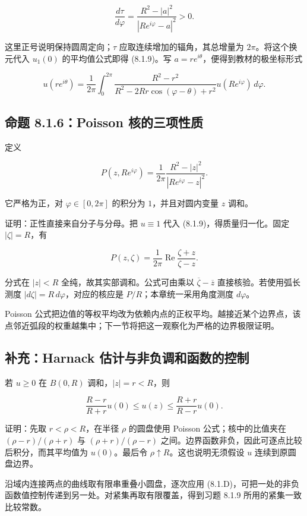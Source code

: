\documentclass[11pt,a4paper]{article}
\begin{document}
\[
\frac{d\tau}{d\varphi}=\frac{R^2-|a|^2}{|Re^{i\varphi}-a|^2}>0.\tag{8.1.7}
\]

这里正号说明保持圆周定向；\(\tau\) 应取连续增加的辐角，其总增量为
\(2\pi\)。将这个换元代入 \(u_1(0)\) 的平均值公式即得 (8.1.9)。写
\(a=re^{i\theta}\)，便得到教材的极坐标形式

\[
u(re^{i\theta})=\frac1{2\pi}\int_0^{2\pi}\frac{R^2-r^2}{R^2-2Rr\cos(\varphi-\theta)+r^2}u(Re^{i\varphi})\,d\varphi.\tag{8.1.10}
\]

\subsection{命题 8.1.6：Poisson 核的三项性质}\label{ch08-s1-heading-8}

定义

\[
P(z,Re^{i\varphi})=\frac1{2\pi}\frac{R^2-|z|^2}{|Re^{i\varphi}-z|^2}.\tag{8.1.11}
\]

它严格为正，对 \(\varphi\in[0,2\pi]\) 的积分为 \(1\)，并且对圆内变量
\(z\) 调和。

证明：正性直接来自分子与分母。把 \(u\equiv1\) 代入
(8.1.9)，得质量归一化。固定 \(|\zeta|=R\)，有

\[
P(z,\zeta)=\frac1{2\pi}\operatorname{Re}\frac{\zeta+z}{\zeta-z}.\tag{8.1.C}
\]

分式在 \(|z|<R\) 全纯，故其实部调和。公式可由乘以
\(\overline\zeta-\overline z\) 直接核验。若使用弧长测度
\(|d\zeta|=R\,d\varphi\)，对应的核应是 \(P/R\)；本章统一采用角度测度
\(d\varphi\)。

Poisson
公式把边值的等权平均改为依赖内点的正权平均。越接近某个边界点，该点邻近弧段的权重越集中；下一节将把这一观察化为严格的边界极限证明。

\subsection*{补充：Harnack 估计与非负调和函数的控制}\label{ch08-s1-heading-9}

若 \(u\ge0\) 在 \(B(0,R)\) 调和，\(|z|=r<R\)，则

\[
\frac{R-r}{R+r}u(0)\le u(z)\le\frac{R+r}{R-r}u(0).\tag{8.1.D}
\]

证明：先取 \(r<\rho<R\)，在半径 \(\rho\) 的圆盘使用 Poisson
公式；核中的比值夹在 \((\rho-r)/(\rho+r)\) 与 \((\rho+r)/(\rho-r)\)
之间。边界函数非负，因此可逐点比较后积分，而其平均值为 \(u(0)\)。最后令
\(\rho\uparrow R\)。这也说明无须假设 \(u\) 连续到原圆盘边界。

沿域内连接两点的曲线取有限串重叠小圆盘，逐次应用
(8.1.D)，可把一处的非负函数值控制传递到另一处。对紧集再取有限覆盖，得到习题
8.1.9 所用的紧集一致比较常数。
\end{document}
